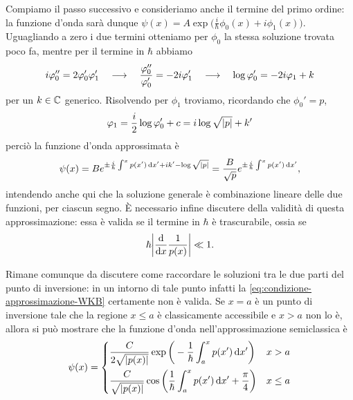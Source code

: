 Compiamo il passo successivo e consideriamo anche il termine del primo ordine: la funzione d'onda sarà dunque $\psi(x)=A\exp\big(\frac{i}{\hbar}\phi_0(x)+i\phi_1(x)\big)$.
Uguagliando a zero i due termini otteniamo per $\phi_0$ la stessa soluzione trovata poco fa, mentre per il termine in $\hbar$ abbiamo
\begin{equation}
	i\varphi_0''=2\varphi_0'\varphi_1'\quad\longrightarrow\quad \frac{\varphi_0''}{\varphi_0'}=-2i\varphi_1'\quad\longrightarrow\quad \log\varphi_0'=-2i\varphi_1+k
\end{equation}
per un $k\in\mathbb{C}$ generico.
Risolvendo per $\phi_1$ troviamo, ricordando che $\phi_0'=p$,
\begin{equation}
	\varphi_1=\frac{i}2\log\varphi_0'+c=i\log\sqrt{\lvert p\rvert}+k'
\end{equation}
perciò la funzione d'onda approssimata è
\begin{equation}
	\psi(x)=Be^{\pm\frac{i}{\hbar}\int^xp(x')\,\dd x'+ik'-\log\sqrt{\abs{p}}}=\frac{B}{\sqrt{p}}e^{\pm\frac{i}{\hbar}\int^xp(x')\,\dd x'},
	\label{eq:soluzione-WKB-ordine-1}
\end{equation}
intendendo anche qui che la soluzione generale è combinazione lineare delle due funzioni, per ciascun segno.
È necessario infine discutere della validità di questa approssimazione: essa è valida se il termine in $\hbar$ è trascurabile, ossia se
\begin{equation}
    \hbar\abs[\bigg]{\drv{}{x}\frac1{p(x)}}\ll 1.
	\label{eq:condizione-approssimazione-WKB}
\end{equation}

Rimane comunque da discutere come raccordare le soluzioni tra le due parti del punto di inversione: in un intorno di tale punto infatti la \eqref{eq:condizione-approssimazione-WKB} certamente non è valida.
Se $x=a$ è un punto di inversione tale che la regione $x\le a$ è classicamente accessibile e $x>a$ non lo è, allora si può mostrare che la funzione d'onda nell'approssimazione semiclassica è
\begin{equation}
	\psi(x)=
	\begin{dcases}
		\frac{C}{2\sqrt{\abs{p(x)}}}\exp\bigg(-\frac1{\hbar}\int_a^xp(x')\,\dd x'\bigg)				&x>a\\
		\frac{C}{\sqrt{\abs{p(x)}}}\cos\bigg(\frac1{\hbar}\int_a^xp(x')\,\dd x'+\frac{\pi}4\bigg)	&x\le a
	\end{dcases}
	\label{eq:wf-semiclassica}
\end{equation}

